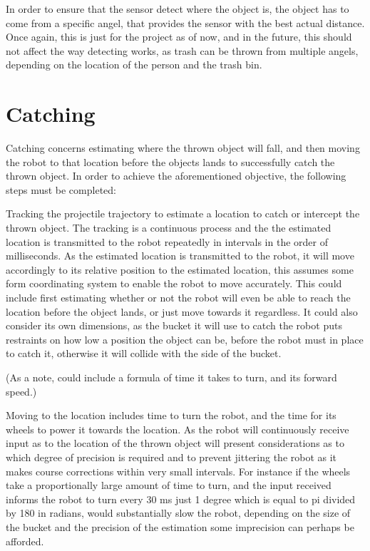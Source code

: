 In order to ensure that the sensor detect where the object is, the object has to come from a specific angel, that provides the sensor with the best actual distance. Once again, this is just for the project as of now, and in the future, this should not affect the way detecting works, as trash can be thrown from multiple angels, depending on the location of the person and the trash bin.


\section{Catching}
\label{sec:catchingTheory}
Catching concerns estimating where the thrown object will fall, and then moving the robot to that location before the objects lands to successfully catch the thrown object. In order to achieve the aforementioned objective, the following steps must be completed:

Tracking the projectile trajectory to estimate a location to catch or intercept the thrown object. The tracking is a continuous process and the the estimated location is transmitted to the robot repeatedly in intervals in the order of milliseconds. As the estimated location is transmitted to the robot, it will move accordingly to its relative position to the estimated location, this assumes some form coordinating system to enable the robot to move accurately. This could include first estimating whether or not the robot will even be able to reach the location before the object lands, or just move towards it regardless. It could also consider its own dimensions, as the bucket it will use to catch the robot puts restraints on how low a position the object can be, before the robot must in place to catch it, otherwise it will collide with the side of the bucket. 

(As a note, could include a formula of time it takes to turn, and its forward speed.)

Moving to the location includes time to turn the robot, and the time for its wheels to power it towards the location. As the robot will continuously receive input as to the location of the thrown object will present considerations as to which degree of precision is required and to prevent jittering the robot as it makes course corrections within very small intervals. For instance if the wheels take a proportionally large amount of time to turn, and the input received informs the robot to turn every 30 ms just 1 degree which is equal to pi divided by 180 in radians, would substantially slow the robot, depending on the size of the bucket and the precision of the estimation some imprecision can perhaps be afforded. 

